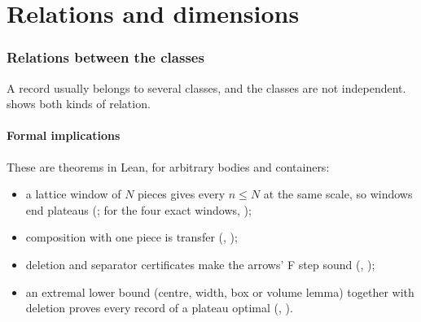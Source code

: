 \documentclass[11pt,a4paper]{article}
\begin{document}
\clearpage
\part{Relations and dimensions}\label{part:rel}

\section{Relations between the classes}\label{sec:relations}

A record usually belongs to several classes, and the classes are not independent.  shows both kinds of relation.

\subsection{Formal implications}
These are theorems in Lean, for arbitrary bodies and containers:
\begin{itemize}
\item a lattice window of $N$ pieces gives every $n\le N$ at the same scale, so windows end plateaus (; for the four exact windows, );
\item composition with one piece is transfer (, );
\item deletion and separator certificates make the arrows' F step sound (, );
\item an extremal lower bound (centre, width, box or volume lemma) together with deletion proves every record of a plateau optimal (, ).
\end{itemize}
\end{document}
